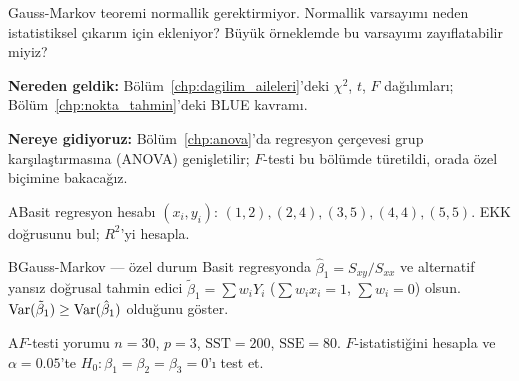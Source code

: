 \begin{ozyansima}
Gauss-Markov teoremi normallik gerektirmiyor. Normallik varsayımı neden istatistiksel çıkarım için ekleniyor? Büyük örneklemde bu varsayımı zayıflatabilir miyiz?
\end{ozyansima}

\begin{kopru}
\textbf{Nereden geldik:} Bölüm~\ref{chp:dagilim_aileleri}'deki $\chi^2$, $t$, $F$ dağılımları; Bölüm~\ref{chp:nokta_tahmin}'deki BLUE kavramı.

\textbf{Nereye gidiyoruz:} Bölüm~\ref{chp:anova}'da regresyon çerçevesi grup karşılaştırmasına (ANOVA) genişletilir; $F$-testi bu bölümde türetildi, orada özel biçimine bakacağız.
\end{kopru}


\cozumlualistirmalar

\begin{alistirma}[Al.15.1]{A}{Basit regresyon hesabı}
$(x_i,y_i)$: $(1,2),(2,4),(3,5),(4,4),(5,5)$. EKK doğrusunu bul; $R^2$'yi hesapla.
\end{alistirma}

\begin{alistirma}[Al.15.2]{B}{Gauss-Markov --- özel durum}
Basit regresyonda $\hat\beta_1=S_{xy}/S_{xx}$ ve alternatif yansız doğrusal tahmin edici $\tilde\beta_1=\sum w_i Y_i$ ($\sum w_i x_i=1$, $\sum w_i=0$) olsun. $\operatorname{Var}(\tilde\beta_1)\geq\operatorname{Var}(\hat\beta_1)$ olduğunu göster.
\end{alistirma}

\alistirmalar

\begin{alistirma}[Al.15.3]{A}{$F$-testi yorumu}
$n=30$, $p=3$, $\mathrm{SST}=200$, $\mathrm{SSE}=80$. $F$-istatistiğini hesapla ve $\alpha=0.05$'te $H_0:\beta_1=\beta_2=\beta_3=0$'ı test et.
\end{alistirma}

